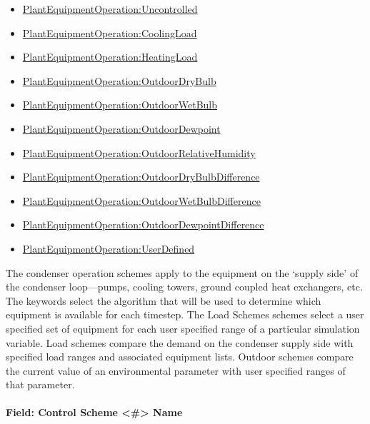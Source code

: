\begin{itemize}
\item
  \hyperref[plantequipmentoperationuncontrolled]{PlantEquipmentOperation:Uncontrolled}
\item
  \hyperref[plantequipmentoperationcoolingload]{PlantEquipmentOperation:CoolingLoad}
\item
  \hyperref[plantequipmentoperationheatingload]{PlantEquipmentOperation:HeatingLoad}
\item
  \hyperref[plantequipmentoperationoutdoordrybulb]{PlantEquipmentOperation:OutdoorDryBulb}
\item
  \hyperref[plantequipmentoperationoutdoorwetbulb]{PlantEquipmentOperation:OutdoorWetBulb}
\item
  \hyperref[plantequipmentoperationoutdoordewpoint]{PlantEquipmentOperation:OutdoorDewpoint}
\item
  \hyperref[plantequipmentoperationoutdoorrelativehumidity]{PlantEquipmentOperation:OutdoorRelativeHumidity}
\item
  \hyperref[plantequipmentoperationoutdoordrybulbdifference]{PlantEquipmentOperation:OutdoorDryBulbDifference}
\item
  \hyperref[plantequipmentoperationoutdoorwetbulbdifference]{PlantEquipmentOperation:OutdoorWetBulbDifference}
\item
  \hyperref[plantequipmentoperationoutdoordewpointdifference]{PlantEquipmentOperation:OutdoorDewpointDifference}
\item
  \hyperref[plantequipmentoperationuserdefined]{PlantEquipmentOperation:UserDefined}
\end{itemize}

The condenser operation schemes apply to the equipment on the `supply side' of the condenser loop---pumps, cooling towers, ground coupled heat exchangers, etc. The keywords select the algorithm that will be used to determine which equipment is available for each timestep. The Load Schemes schemes select a user specified set of equipment for each user specified range of a particular simulation variable. Load schemes compare the demand on the condenser supply side with specified load ranges and associated equipment lists. Outdoor schemes compare the current value of an environmental parameter with user specified ranges of that parameter.

\paragraph{Field: Control Scheme \textless{}\#\textgreater{} Name}\label{field-control-scheme-name-1}

